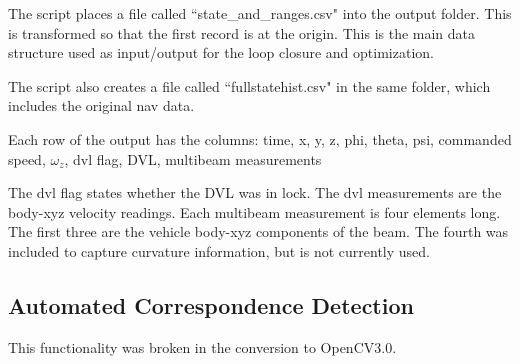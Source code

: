 \documentclass[12pt]{amsart}
\begin{document}
The script places a file called ``state\_and\_ranges.csv" into the output folder. This is transformed so that the first record is at the origin. This is the main data structure used as input/output for the loop closure and optimization. 

The script also creates a file called ``fullstatehist.csv" in the same folder, which includes the original nav data.

Each row of the output has the columns:
time, x, y, z, phi, theta, psi, commanded speed, $\omega_z$, dvl flag, DVL, multibeam measurements

The dvl flag states whether the DVL was in lock. The dvl measurements are the body-xyz velocity readings. Each multibeam measurement is four elements long. The first three are the vehicle body-xyz components of the beam. The fourth was included to capture curvature information, but is not currently used.

\subsection{Automated Correspondence Detection}

This functionality was broken in the conversion to OpenCV3.0. 
\end{document}
